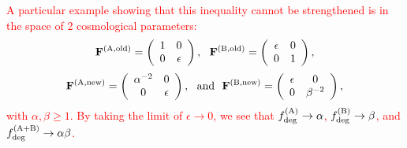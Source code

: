 \documentclass[usenatbib]{mnras}
\newcommand{\changetext}[1]{\textcolor{red}{#1}}
\begin{document}
\changetext{A particular example showing that this inequality cannot be strengthened is in the space of 2 cosmological parameters:
\begin{equation}
{\bf F}^{\rm(A,old)} = \left( \begin{array}{cc} 1 & 0 \\ 0 & \epsilon \end{array} \right),
~~
{\bf F}^{\rm(B,old)} = \left( \begin{array}{cc} \epsilon & 0 \\ 0 & 1 \end{array} \right),
\nonumber
\end{equation}
\begin{equation}
{\bf F}^{\rm(A,new)} = \left( \begin{array}{cc} \alpha^{-2} & 0 \\ 0 & \epsilon \end{array} \right),
~~{\rm and}~~
{\bf F}^{\rm(B,new)} = \left( \begin{array}{cc} \epsilon & 0 \\ 0 & \beta^{-2} \end{array} \right),
\end{equation}
with $\alpha,\beta\ge 1$. By taking the limit of $\epsilon\rightarrow 0$, we see that $f_{\rm deg}^{\rm(A)}\rightarrow\alpha$, $f_{\rm deg}^{\rm(B)}\rightarrow\beta$, and $f_{\rm deg}^{\rm(A+B)}\rightarrow \alpha\beta$.
}

\bsp	
\label{lastpage}
\end{document}
